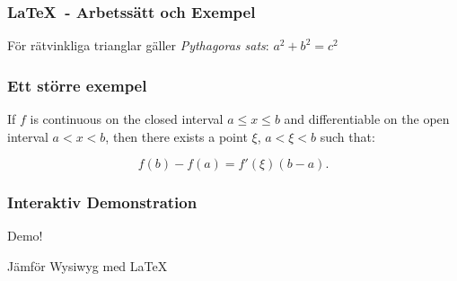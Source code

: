 \begin{frame}[fragile,t]
  \frametitle{\LaTeX\ - Arbetssätt och Exempel}
  \vspace{3em}

  \blankline

  \begin{exlatex}
  För rätvinkliga trianglar gäller \emph{Pythagoras sats}: $a^2 + b^2 = c^2$
  \end{exlatex}

  \blankline

\end{frame}

\begin{frame}[fragile,t]
  \frametitle{Ett större exempel}
  \vspace{3em}

  \begin{exlatex}
If $f$ is continuous on the closed interval $a \leq x \leq b$ 
and differentiable on the open interval $a < x < b$, then there 
exists a point $\xi$, $a < \xi < b$ such that:

\begin{displaymath}
  f(b) - f(a) = f'(\xi)(b - a).
\end{displaymath}

\end{exlatex}

\end{frame}

\begin{frame}[fragile]
  \frametitle{Interaktiv Demonstration}

  \begin{center}
    \Huge Demo!

    \bigskip
    \Large Jämför {\sc Wysiwyg} med \LaTeX
  \end{center}

\end{frame}

